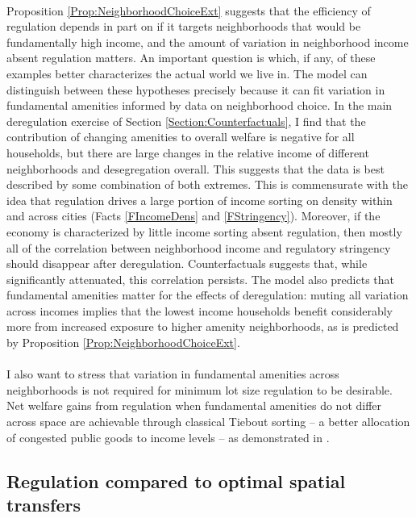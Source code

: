 \documentclass[12pt]{article}
\begin{document}
\paragraph*{}
Proposition \ref{Prop:NeighborhoodChoiceExt}  suggests that the efficiency of regulation depends in part on if it targets neighborhoods that would be fundamentally high income, and the amount of variation in neighborhood income absent regulation matters. An important question is which, if any, of these examples better characterizes the actual world we live in. The model can distinguish between these hypotheses precisely because it can fit variation in fundamental amenities informed by data on neighborhood choice. In the main deregulation exercise of Section \ref{Section:Counterfactuals}, I find that the contribution of changing amenities to overall welfare is negative for all households, but there are large changes in the relative income of different neighborhoods and desegregation overall. This suggests that the data is best described by some combination of both extremes. This is commensurate with the idea that regulation drives a large portion of income sorting on density within and across cities (Facts \ref{FIncomeDens} and \ref{FStringency}). Moreover, if the economy is characterized by little income sorting absent regulation, then mostly all of the correlation between neighborhood income and regulatory stringency should disappear after deregulation. Counterfactuals suggests that, while significantly attenuated, this correlation persists. The model also predicts that fundamental amenities matter for the effects of deregulation: muting all variation across incomes implies that the lowest income households benefit considerably more from increased exposure to higher amenity neighborhoods, as is predicted by Proposition \ref{Prop:NeighborhoodChoiceExt}.

\paragraph*{}
I also want to stress that variation in fundamental amenities across neighborhoods is not required for minimum lot size regulation to be desirable. Net welfare gains from regulation when fundamental amenities do not differ across space are achievable through classical Tiebout sorting -- a better allocation of congested public goods to income levels -- as demonstrated in \cite{calabresetal}.


\subsection{Regulation compared to optimal spatial transfers}
\end{document}
